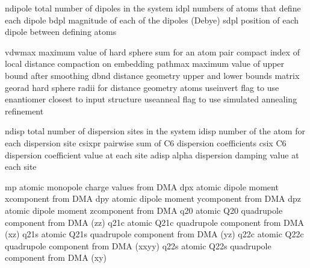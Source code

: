 \documentclass[letterpaper,11pt,english]{sphinxmanual}
\begin{document}
\sphinxAtStartPar
{}

\begin{sphinxVerbatim}[commandchars=\\\{\}]
ndipole         total number of dipoles in the system
idpl            numbers of atoms that define each dipole
bdpl            magnitude of each of the dipoles (Debye)
sdpl            position of each dipole between defining atoms
\end{sphinxVerbatim}

\sphinxAtStartPar
{}

\begin{sphinxVerbatim}[commandchars=\\\{\}]
vdwmax          maximum value of hard sphere sum for an atom pair
compact         index of local distance compaction on embedding
pathmax         maximum value of upper bound after smoothing
dbnd            distance geometry upper and lower bounds matrix
georad          hard sphere radii for distance geometry atoms
use\PYGZus{}invert      flag to use enantiomer closest to input structure
use\PYGZus{}anneal      flag to use simulated annealing refinement
\end{sphinxVerbatim}

\sphinxAtStartPar
{}

\begin{sphinxVerbatim}[commandchars=\\\{\}]
ndisp           total number of dispersion sites in the system
idisp           number of the atom for each dispersion site
csixpr          pairwise sum of C6 dispersion coefficients
csix            C6 dispersion coefficient value at each site
adisp           alpha dispersion damping value at each site
\end{sphinxVerbatim}

\sphinxAtStartPar
{}

\begin{sphinxVerbatim}[commandchars=\\\{\}]
mp              atomic monopole charge values from DMA
dpx             atomic dipole moment x\PYGZhy{}component from DMA
dpy             atomic dipole moment y\PYGZhy{}component from DMA
dpz             atomic dipole moment z\PYGZhy{}component from DMA
q20             atomic Q20 quadrupole component from DMA (zz)
q21c            atomic Q21c quadrupole component from DMA (xz)
q21s            atomic Q21s quadrupole component from DMA (yz)
q22c            atomic Q22c quadrupole component from DMA (xx\PYGZhy{}yy)
q22s            atomic Q22s quadrupole component from DMA (xy)
\end{sphinxVerbatim}
\end{document}
